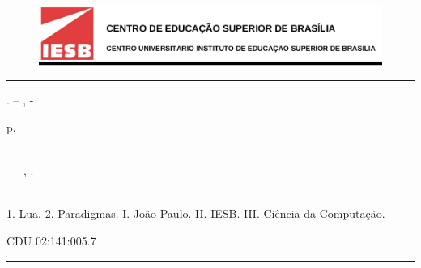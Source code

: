 \documentclass[
12pt, %
openright, %
oneside, %
a4paper, %
english, %
brazil, %
]{abntex2}
\begin{document}
\frenchspacing


\begin{figure}[H]
\centering
\includegraphics[width=0.9\linewidth]{imagens/capa.png}
\end{figure}
\imprimircapa

\imprimirfolhaderosto*


%
\begin{fichacatalografica}
\vspace*{\fill}	%
\hrule	%
\begin{center}	%
\begin{minipage}[c]{12.5cm}	%

\imprimirautor

\hspace{0.5cm} \imprimirtitulo. --
\imprimirlocal, \imprimirdata-

\hspace{0.5cm} \pageref{LastPage} p.\\

\hspace{0.5cm} \imprimirorientadorRotulo~\imprimirorientador\\

\hspace{0.5cm}
\parbox[t]{\textwidth}{\imprimirtipotrabalho~--~\imprimirinstituicao,
\imprimirdata.}\\

\hspace{0.5cm}
1. Lua.
2. Paradigmas.
I. João Paulo.
II. IESB.
III. Ciência da Computação.

\hspace{8.75cm} CDU 02:141:005.7\\

\end{minipage}
\end{center}
\hrule
\end{fichacatalografica}
\end{document}
